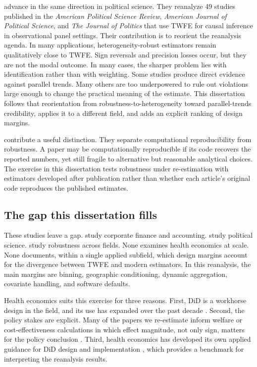 \textcite{chiu2026causal} advance in the same direction in political science. They reanalyze 49 studies published in the \emph{American Political Science Review}, \emph{American Journal of Political Science}, and \emph{The Journal of Politics} that use TWFE for causal inference in observational panel settings. Their contribution is to reorient the reanalysis agenda. In many applications, heterogeneity-robust estimators remain qualitatively close to TWFE. Sign reversals and precision losses occur, but they are not the modal outcome. In many cases, the sharper problem lies with identification rather than with weighting. Some studies produce direct evidence against parallel trends. Many others are too underpowered to rule out violations large enough to change the practical meaning of the estimate. This dissertation follows that reorientation from robustness-to-heterogeneity toward parallel-trends credibility, applies it to a different field, and adds an explicit ranking of design margins.

\textcite{brodeur2026reproducibility} contribute a useful distinction. They separate computational reproducibility from robustness. A paper may be computationally reproducible if its code recovers the reported numbers, yet still fragile to alternative but reasonable analytical choices. The exercise in this dissertation tests robustness under re-estimation with estimators developed after publication rather than whether each article's original code reproduces the published estimates.

\subsection{The gap this dissertation fills}
\label{sec:ch2_gap}

These studies leave a gap. \textcite{baker2022much} study corporate finance and accounting. \textcite{chiu2026causal} study political science. \textcite{brodeur2026reproducibility} study robustness across fields. None examines health economics at scale. None documents, within a single applied subfield, which design margins account for the divergence between TWFE and modern estimators. In this reanalysis, the main margins are binning, geographic conditioning, dynamic aggregation, covariate handling, and software defaults.

Health economics suits this exercise for three reasons. First, DiD is a workhorse design in the field, and its use has expanded over the past decade \parencite{goldsmith2024tracking}. Second, the policy stakes are explicit. Many of the papers we re-estimate inform welfare or cost-effectiveness calculations in which effect magnitude, not only sign, matters for the policy conclusion \parencite{stinnett1998net}. Third, health economics has developed its own applied guidance for DiD design and implementation \parencite{wing2018designing}, which provides a benchmark for interpreting the reanalysis results.

